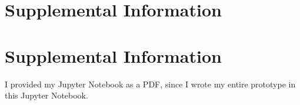 \chapter{Supplemental Information}\label{app:supplemental-information}

\chapter{Supplemental Information}\label{app:supplemental-information}

I provided my Jupyter Notebook as a PDF, since I wrote my entire prototype in this Jupyter Notebook. 


